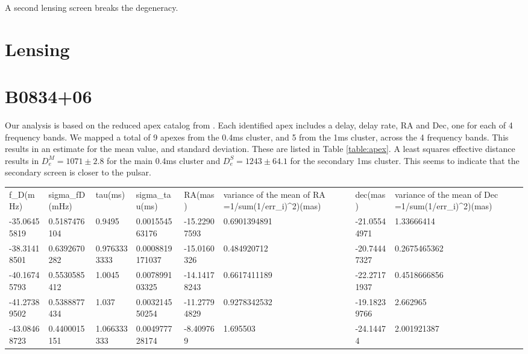 \documentclass[useAMS,usenatbib]{mn2e}
\begin{document}
A second lensing screen breaks the degeneracy.

\section{Lensing}

\section{B0834+06}

Our analysis is based on the reduced apex catalog from
\citet{2010ApJ...708..232B}. Each identified apex includes a delay,
delay rate, RA and Dec, one for each of 4 frequency bands.  We mapped
a total of 9 apexes from the 0.4ms cluster, and 5 from the 1ms
cluster, across the 4 frequency bands.  This results in an estimate
for the mean value, and standard deviation.  These are listed in Table
\ref{table:apex}.  A least squares effective distance results in
$D_e^M=1071\pm 2.8$ for the main 0.4ms cluster and $D_e^S = 1243 \pm 64.1$ for
the secondary 1ms cluster.  This seems to indicate that the secondary
screen is closer to the pulsar.

\begin{table}[h]
\begin{tabular}{llllllll}
f\_D(mHz)    & sigma\_fD(mHz) & tau(ms)      & sigma\_tau(ms)  & RA(mas)      & variance of the mean of RA =1/sum(1/err\_i)\textasciicircum 2)(mas) & dec(mas)     & variance of the mean of Dec =1/sum(1/err\_i)\textasciicircum 2)(mas) \\
-35.06455819 & 0.5187476104   & 0.9495       & 0.001554563176  & -15.22907593 & 0.6901394891                                                        & -21.05544971 & 1.33666414                                                           \\
-38.31418501 & 0.6392670282   & 0.9763333333 & 0.0008819171037 & -15.0160326  & 0.484920712                                                         & -20.74447327 & 0.2675465362                                                         \\
-40.16745793 & 0.5530585412   & 1.0045       & 0.007899103325  & -14.14178243 & 0.6617411189                                                        & -22.27171937 & 0.4518666856                                                         \\
-41.27389502 & 0.5388877434   & 1.037        & 0.003214550254  & -11.27794829 & 0.9278342532                                                        & -19.18239766 & 2.662965                                                             \\
-43.08468723 & 0.4400015151   & 1.066333333  & 0.004977728174  & -8.409769    & 1.695503                                                            & -24.14474    & 2.001921387                                                         
\end{tabular}
\end{table}
\end{document}
